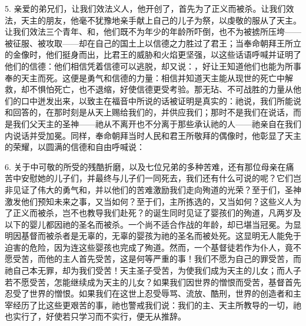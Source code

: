 5. 亲爱的弟兄们，让我们效法义人，他开创了，首先为了正义而被杀。让我们效法，天主的朋友，他毫不犹豫地亲手献上自己的儿子为祭，以虔敬的服从了天主。让我们效法三个青年、和，他们既不为年少的年龄所吓倒，也不为被掳所压垮——被征服、被攻取——却在自己的国土上以信德之力胜过了君王；当奉命朝拜王所立的金像时，他们挺身而出，比君王的威胁和火焰更坚强，以这些话语呼喊并证明了他们的信德：他们相信凭着信德可以逃脱，却又说：，好让王知道他们也能为所事奉的天主而死。这便是勇气和信德的力量：相信并知道天主能从现世的死亡中解救，却不惧怕死亡，也不退缩，好使信德更受考验。那无玷、不可战胜的力量从他们的口中迸发出来，以致主在福音中所说的话被证明是真实的：祂说，我们所能说和回答的，在那时刻是从天上赐给我们的，并供应我们；那时不是我们在说话，而是我们父天主的圣神——祂从不离开也不分离于那些承认祂的人——祂亲自在我们内说话并受加冕。同样，奉命朝拜当时人民和君王所敬拜的偶像时，他彰显了天主的荣耀，以圆满的信德和自由呼喊说：\par

6. 关于中可敬的所受的残酷折磨，以及七位兄弟的多种苦难，还有那位母亲在痛苦中安慰她的儿子们，并最终与儿子们一同死去，我们还有什么可说的呢？它们岂非见证了伟大的勇气和，并以他们的苦难激励我们走向殉道的光荣？至于们，圣神激发他们预知未来之事，又当如何？至于们，主所拣选的，又当如何？这些义人为了正义而被杀，岂不也教导我们赴死？的诞生同时见证了婴孩们的殉道，凡两岁及以下的婴儿都因祂的圣名而被杀。一个尚不适合作战的年龄，却已堪当冠冕。为显明因基督而被杀者是无辜的，无辜的婴孩为祂的圣名而被处死。这显明无人能免于迫害的危险，因为连这些婴孩也完成了殉道。然而，一个基督徒若作为仆人，竟不愿受苦，而他的主人首先受苦，这是何等严重的事！我们不愿为自己的罪受苦，而祂自己本无罪，却为我们受苦！天主圣子受苦，为使我们成为天主的儿女；而人子若不愿受苦，怎能继续成为天主的儿女？如果我们因世界的憎恨而受苦，基督首先忍受了世界的憎恨。如果我们在这世上忍受辱骂、流放、酷刑，世界的创造者和主宰经历了比这些更艰苦的事，祂也警戒我们说：我们的主、天主所教导的一切，祂也实行了，好使若只学习而不实行，便无从推辞。\par

